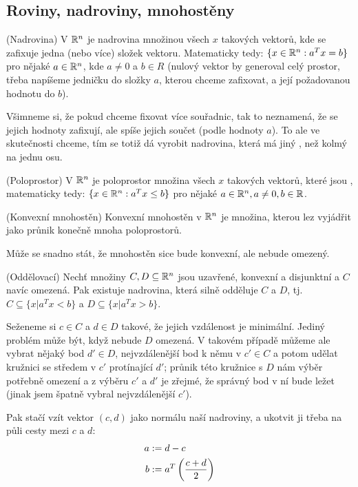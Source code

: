 \subsection{Roviny, nadroviny, mnohostěny}

\df (Nadrovina) V $\mathbb{R}^n$ je nadrovina množinou všech $x$ takových vektorů, kde
se zafixuje jedna (nebo více) složek vektoru. Matematicky tedy: $\{x \in \mathbb{R}^n:
a^Tx = b\}$ pro nějaké $a \in \mathbb{R}^n$, kde $a \neq 0$ a $b \in R$ (nulový vektor by generoval
celý prostor, třeba napíšeme jedničku do složky $a$, kterou chceme zafixovat,
a její požadovanou hodnotu do $b$).

\poz Všimneme si, že pokud chceme fixovat více souřadnic, tak to neznamená, že
se jejich hodnoty zafixují, ale spíše jejich součet (podle hodnoty $a$). To ale
ve skutečnosti chceme, tím se totiž dá vyrobit nadrovina, která má jiný
, než kolmý na jednu osu.

\df (Poloprostor) V $\mathbb{R}^n$ je poloprostor množina všech $x$ takových vektorů,
které jsou , matematicky tedy:  $\{x \in \mathbb{R}^n:
a^Tx \leq b\}$ pro nějaké $a \in \mathbb{R}^n, a \neq 0, b \in \mathbb{R}$.

\df (Konvexní mnohostěn) Konvexní mnohostěn v $\mathbb{R}^n$ je množina, kterou lez
vyjádřit jako průnik konečně mnoha poloprostorů.

\poz Může se snadno stát, že mnohostěn sice bude konvexní, ale nebude omezený.

\vt (Oddělovací) Nechť množiny $C,D \subseteq \mathbb{R}^n$ jsou uzavřené, konvexní a disjunktní
a $C$ navíc omezená. Pak existuje nadrovina, která silně odděluje $C$ a $D$, tj.
$C \subseteq \{x | a^Tx < b\}$ a $D \subseteq \{x | a^T x > b\}$.

\dk Seženeme si $c \in C$ a $d \in D$ takové, že jejich vzdálenost je minimální.
Jediný problém může být, když nebude $D$ omezená. V takovém případě můžeme ale
vybrat nějaký bod $d'\in D$, nejvzdálenější bod k němu v $c'\in C$ a potom
udělat kružnici se středem v $c'$ protínající $d'$; průnik této kružnice s $D$
nám výběr potřebně omezení a z výběru $c'$ a $d'$ je zřejmé, že správný bod v ní
bude ležet (jinak jsem špatně vybral nejvzdálenější $c'$).

Pak stačí vzít vektor $(c,d)$ jako normálu naší nadroviny, a ukotvit ji třeba na
půli cesty mezi $c$ a $d$:
\begin{align}
	a &:= d - c \\
	b &:= a^T\left({c+d \over 2}\right)
\end{align}

